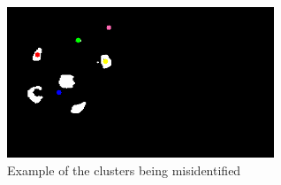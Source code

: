 \documentclass[12pt,a4paper]{article}
\begin{document}
    \begin{figure}[h]
      \caption{Example of the clusters being misidentified}
      \includegraphics[width=8cm]{952}
    \end{figure}
\end{document}
